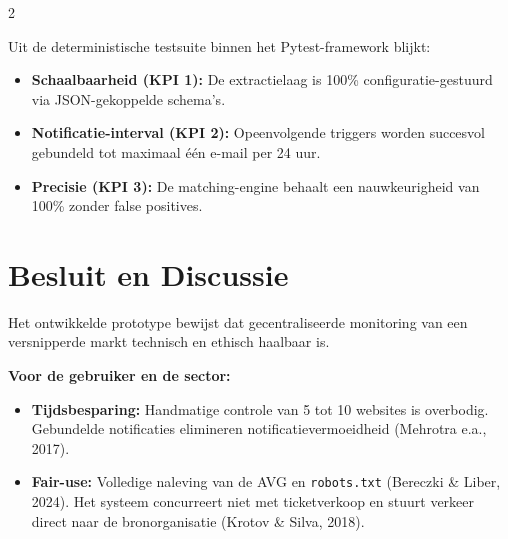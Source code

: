 \documentclass[a0,portrait]{hogent-poster}
\begin{document}
\begin{multicols}{2}
\begin{center}
\end{center}

\vspace{0.5cm}

Uit de deterministische testsuite binnen het Pytest-framework blijkt:
\begin{itemize}
    \item \textbf{Schaalbaarheid (KPI 1):} De extractielaag is 100\% configuratie-gestuurd via JSON-gekoppelde schema's.
    \item \textbf{Notificatie-interval (KPI 2):} Opeenvolgende triggers worden succesvol gebundeld tot maximaal één e-mail per 24 uur.
    \item \textbf{Precisie (KPI 3):} De matching-engine behaalt een nauwkeurigheid van 100\% zonder false positives.
\end{itemize}

\section{Besluit en Discussie}

Het ontwikkelde prototype bewijst dat gecentraliseerde monitoring van een versnipperde markt technisch en ethisch haalbaar is.

\textbf{Voor de gebruiker en de sector:}
\begin{itemize}
    \item \textbf{Tijdsbesparing:} Handmatige controle van 5 tot 10 websites is overbodig. Gebundelde notificaties elimineren notificatievermoeidheid (Mehrotra e.a., 2017).
    \item \textbf{Fair-use:} Volledige naleving van de AVG en \texttt{robots.txt} (Bereczki \& Liber, 2024). Het systeem concurreert niet met ticketverkoop en stuurt verkeer direct naar de bronorganisatie (Krotov \& Silva, 2018).
\end{itemize}


\end{multicols}
\end{document}
